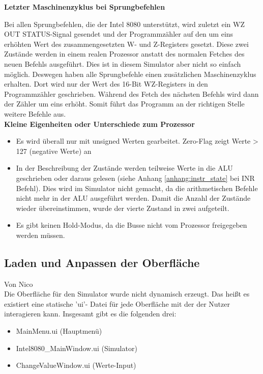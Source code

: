 \documentclass[12pt]{article}
\newcommand{\imgSpaceBefore}{\vspace{10pt}}
\begin{document}
\noindent
\textbf{Letzter Maschinenzyklus bei Sprungbefehlen}

\noindent
Bei allen Sprungbefehlen, die der Intel 8080 unterstützt, wird zuletzt ein WZ OUT STATUS-Signal gesendet und der Programmzähler auf den um eins erhöhten Wert des zusammengesetzten W- und Z-Registers gesetzt. Diese zwei Zustände werden in einem realen Prozessor anstatt des normalen Fetches des neuen Befehls ausgeführt. Dies ist in diesem Simulator aber nicht so einfach möglich. Deswegen haben alle Sprungbefehle einen zusätzlichen Maschinenzyklus erhalten. Dort wird nur der Wert des 16-Bit WZ-Registers in den Programmzähler geschrieben. Während des Fetch des nächsten Befehls wird dann der Zähler um eins erhöht. Somit führt das Programm an der richtigen Stelle weitere Befehle aus.
\\

\noindent
\textbf{Kleine Eigenheiten oder Unterschiede zum Prozessor}

\noindent
\begin{itemize}
\item Es wird überall nur mit unsigned Werten gearbeitet. Zero-Flag zeigt Werte > 127 (negative Werte) an
\item In der Beschreibung der Zustände werden teilweise Werte in die ALU geschrieben oder daraus gelesen (siehe Anhang \ref{anhang:instr_state} bei INR Befehl). Dies wird im Simulator nicht gemacht, da die arithmetischen Befehle nicht mehr in der ALU ausgeführt werden. Damit die Anzahl der Zustände wieder übereinstimmen, wurde der vierte Zustand in zwei aufgeteilt.
\item Es gibt keinen Hold-Modus, da die Busse nicht vom Prozessor freigegeben werden müssen.
\end{itemize}

\subsection{Laden und Anpassen der Oberfläche}\label{chapter:LadenDObfl}
Von Nico\\

\noindent
Die Oberfläche für den Simulator wurde nicht dynamisch erzeugt. Das heißt es existiert eine statische 'ui'- Datei für jede Oberfläche mit der der Nutzer interagieren kann. Insgesamt gibt es die folgenden drei:\imgSpaceBefore

\begin{itemize}
	\item MainMenu.ui (Hauptmenü)
	\item Intel8080\_MainWindow.ui (Simulator)
	\item ChangeValueWindow.ui (Werte-Input)
\end{itemize}
\end{document}
